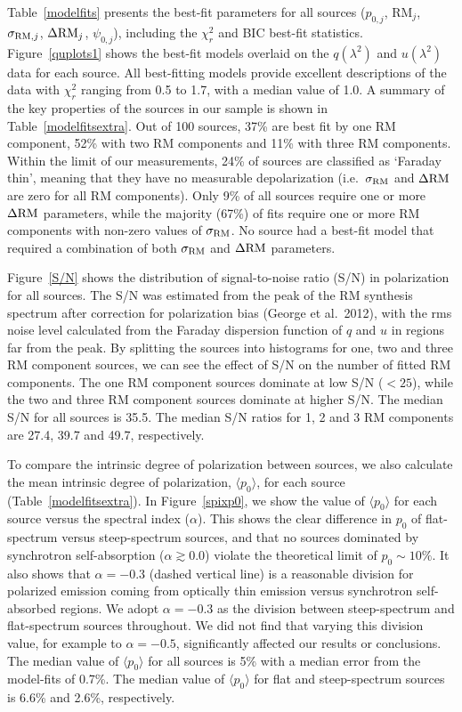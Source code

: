 \documentclass{mnras}
\newcommand*\sigmaRM{\sigma_{\rm RM}}
\newcommand*\DeltaRM{\Delta{\rm RM}}
\newcommand*\gradRM{\Delta{\rm RM}}
\begin{document}
Table~\ref{modelfits} presents the best-fit parameters for all sources ($p_{0,j}$, RM$_j$, $\sigma_{{\rm RM},j}$, $\DeltaRM_j$, $\psi_{0,j}$), including the $\chi^2_{r}$ and BIC best-fit statistics. Figure~\ref{quplots1} shows the best-fit models overlaid on the $q(\lambda^2)$ and $u(\lambda^2)$ data for each source. 
All best-fitting models provide excellent descriptions of the data with $\chi^2_{r}$ ranging from 0.5 to 1.7, with a median value of 1.0.  
A summary of the key properties of the sources in our sample is shown in Table~\ref{modelfitsextra}. 
Out of 100 sources, 37\% are best fit by one RM component, 52\% with two RM components and 11\% with three RM components. 
Within the limit of our measurements, 24\% of sources are classified as `Faraday thin', meaning that they have no measurable depolarization (i.e.~$\sigmaRM$ and $\gradRM$ are zero for all RM components). Only 9\% of all sources require one or more $\gradRM$ parameters, while the majority (67\%) of fits require one or more RM components with non-zero values of $\sigmaRM$. No source had a best-fit model that required a combination of both $\sigmaRM$ and $\gradRM$ parameters. 

Figure~\ref{S/N} shows the distribution of signal-to-noise ratio (S/N) in polarization for all sources. The S/N was estimated from the peak of the RM synthesis spectrum after correction for polarization bias (George et al.~2012), with the rms noise level calculated from the Faraday dispersion function of $q$ and $u$ in regions far from the peak. 
By splitting the sources into histograms for one, two and three RM component sources, we can see the effect of S/N on the number of fitted RM components. The one RM component sources dominate at low S/N ($< 25$), while the two and three RM component sources dominate at higher S/N.  The median S/N for all sources is 35.5. The median S/N ratios for 1, 2 and 3 RM components are 27.4, 39.7 and 49.7, respectively. 

To compare the intrinsic degree of polarization between sources, we also calculate the mean intrinsic degree of polarization, $\langle p_0 \rangle$, for each source (Table~\ref{modelfitsextra}). 
In Figure~\ref{spixp0}, we show the value of $\langle p_0 \rangle$ for each source versus the spectral index ($\alpha$). This shows the clear difference in $p_0$ of flat-spectrum versus steep-spectrum sources, and that no sources dominated by synchrotron self-absorption ($\alpha\gtrsim 0.0$) violate the theoretical limit of $p_0\sim10\%$. It also shows that $\alpha=-0.3$ (dashed vertical line) is a reasonable division for polarized emission coming from optically thin emission versus synchrotron self-absorbed regions. We adopt $\alpha=-0.3$ as the division between steep-spectrum and flat-spectrum sources throughout. We did not find that varying this division value, for example to $\alpha=-0.5$, significantly affected our results or conclusions. 
The median value of $\langle p_0 \rangle$ for all sources is 5\% with a median error from the model-fits of 0.7\%. The median value of $\langle p_0 \rangle$ for flat and steep-spectrum sources is 6.6\% and 2.6\%, respectively. 
\end{document}
